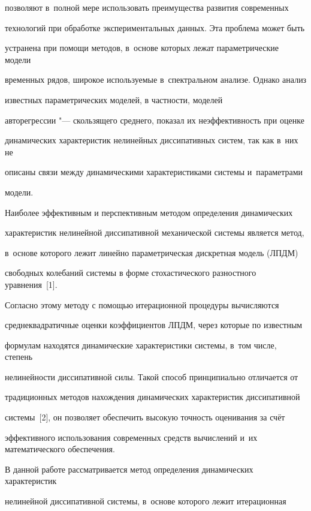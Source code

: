 позволяют в~полной мере использовать преимущества развития современных 


технологий при обработке экспериментальных данных. Эта проблема может быть 


устранена при помощи методов, в~основе которых лежат параметрические модели 


временных рядов, широкое используемые в~спектральном анализе. Однако анализ 


известных параметрических моделей, в частности, моделей 


авторегрессии "--- скользящего среднего, показал их неэффективность при оценке 


динамических характеристик нелинейных диссипативных систем, так как в~них не 


описаны связи между динамическими характеристиками системы и~параметрами 


модели.





Наиболее эффективным и перспективным методом определения динамических 


характеристик нелинейной диссипативной механической системы является метод, 


в~основе которого лежит линейно параметрическая дискретная модель (ЛПДМ) 


свободных колебаний системы в форме стохастического разностного уравнения~[1]. 


Согласно этому методу с помощью итерационной процедуры вычисляются 


среднеквадратичные оценки коэффициентов ЛПДМ, через которые по известным 


формулам находятся динамические характеристики системы, в~том числе, степень 


нелинейности диссипативной силы. Такой способ принципиально отличается от 


традиционных методов нахождения динамических характеристик диссипативной 


системы~[2], он позволяет обеспечить высокую точность оценивания за счёт 


эффективного использования современных средств вычислений и~их математического обеспечения.





В данной работе рассматривается метод определения динамических характеристик 


нелинейной диссипативной системы, в~основе которого лежит итерационная 


